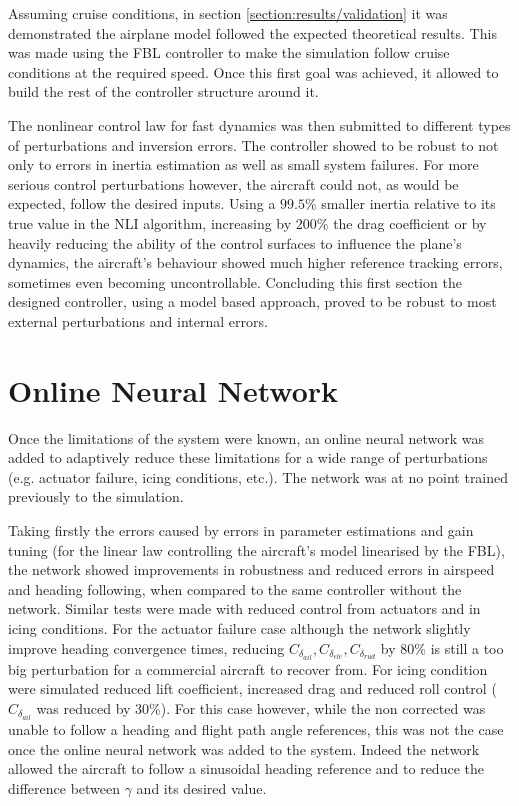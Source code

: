Assuming cruise conditions, in section \ref{section:results/validation} it was demonstrated the airplane model followed the expected theoretical results. This was made using the FBL controller to make the simulation follow cruise conditions at the required speed. Once this first goal was achieved, it allowed to build the rest of the controller structure around it. 

The nonlinear control law for fast dynamics was then submitted to different types of perturbations and inversion errors. The controller showed to be robust to not only to errors in inertia estimation as well as small system failures. For more serious control perturbations however, the aircraft could not, as would be expected, follow the desired inputs. Using a $99.5\%$ smaller inertia relative to its true value in the NLI algorithm, increasing by $200\%$ the drag coefficient or by heavily reducing the ability of the control surfaces to influence the plane's dynamics, the aircraft's behaviour showed much higher reference tracking errors, sometimes even becoming uncontrollable. Concluding this first section the designed controller, using a model based approach, proved to be robust to most external perturbations and internal errors. 


\section{Online Neural Network}
\label{section:conclusions/online_neural_network}

Once the limitations of the system were known, an online neural network was added to adaptively reduce these limitations for a wide range of perturbations (e.g. actuator failure, icing conditions, etc.). The network was at no point trained previously to the simulation. 

Taking firstly the errors caused by errors in parameter estimations and gain tuning (for the linear law controlling the aircraft's model linearised by the FBL), the network showed improvements in robustness and reduced errors in airspeed and heading following, when compared to the same controller without the network. Similar tests were made with reduced control from actuators and in icing conditions. For the actuator failure case although the network slightly improve heading convergence times, reducing $C_{\delta_{ail}}, C_{\delta_{ele}}, C_{\delta_{rud}}$ by 80\% is still a too big perturbation for a commercial aircraft to recover from. For icing condition were simulated reduced lift coefficient, increased drag and reduced roll control ($C_{\delta_{ail}}$ was reduced by 30\%). For this case however, while the non corrected was unable to follow a heading and flight path angle references, this was not the case once the online neural network was added to the system. Indeed the network allowed the aircraft to follow a sinusoidal heading reference and to reduce the difference between $\gamma$ and its desired value. 

